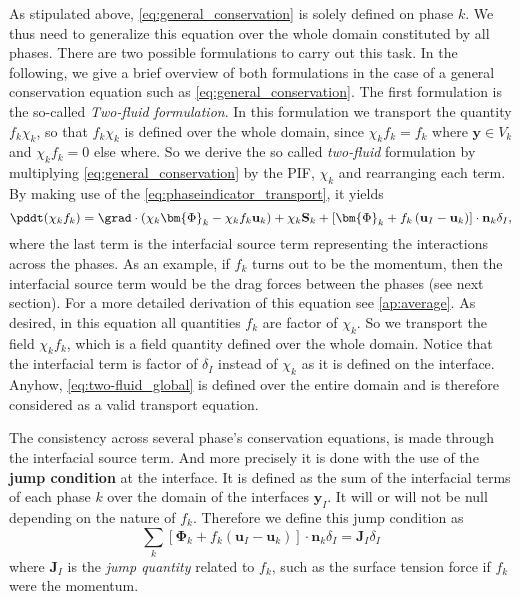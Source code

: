 As stipulated above, \ref{eq:general_conservation} is solely defined on phase $k$.
We thus need to generalize this equation over the whole domain constituted by all phases.  
There are two possible formulations to carry out this task.
In the following, we give a brief overview of both formulations in the case of a general conservation equation such as \ref{eq:general_conservation}.
The first formulation is the so-called \textit{Two-fluid formulation}.
In this formulation we transport the quantity $f_k\chi_k$, so that $f_k\chi_k$ is defined over the whole domain, since $\chi_k f_k = f_k$ where $\textbf{y} \in V_k$ and $\chi_k f_k = 0$ else where.
So we derive the so called \textit{two-fluid} formulation by multiplying \ref{eq:general_conservation} by the PIF, $\chi_k$ and rearranging each term. 
By making use of the \ref{eq:phaseindicator_transport}, it yields  
\begin{equation}
    \pddt (\chi_k f_k)
    = \grad \cdot (\chi_k \bm{\Phi}_k - \chi_k f_k \textbf{u}_k)
    + \chi_k \textbf{S}_k
    + \left[
        \bm{\Phi}_k 
        + f_k 
        \left(
            \textbf{u}_I
            - \textbf{u}_k
        \right) 
    \right]
    \cdot \textbf{n}_k \delta_I, 
    \label{eq:two-fluid_global}
\end{equation}
where the last term is the interfacial source term representing the interactions across the phases. 
As an example, if $f_k$ turns out to be the momentum, then the interfacial source term would be the drag forces between the phases (see next section). 
For a more detailed derivation of this equation see \ref{ap:average}.
As desired, in this equation all quantities $f_k$ are factor of $\chi_k$. 
So we transport the field $\chi_k f_k$, which is a field quantity defined over the whole domain. 
Notice that the interfacial term is factor of $\delta_I$ instead of $\chi_k$ as it is defined on the interface.
Anyhow, \ref{eq:two-fluid_global} is defined over the entire domain and is therefore considered as a valid transport equation. 

The consistency across several phase's conservation equations, is made through the interfacial source term.  
And more precisely it is done with the use of the \textbf{jump condition} at the interface.
It is defined as the sum of the interfacial terms of each phase $k$ over the domain of the interfaces $\textbf{y}_I$. 
It will or will not be null depending on the nature of $f_k$. 
Therefore we define this jump condition as
\begin{equation}
    \sum_k 
    \left[
        \bm{\Phi}_k 
        + f_k 
        \left(
            \textbf{u}_I
            - \textbf{u}_k
        \right) 
    \right]
    \cdot \textbf{n}_k\delta_I
    = \textbf{J}_I\delta_I
    \label{eq:general_jump}
\end{equation}
where $\textbf{J}_I$ is the \textit{jump quantity} related to $f_k$, such as the surface tension force if $f_k$ were the momentum.

